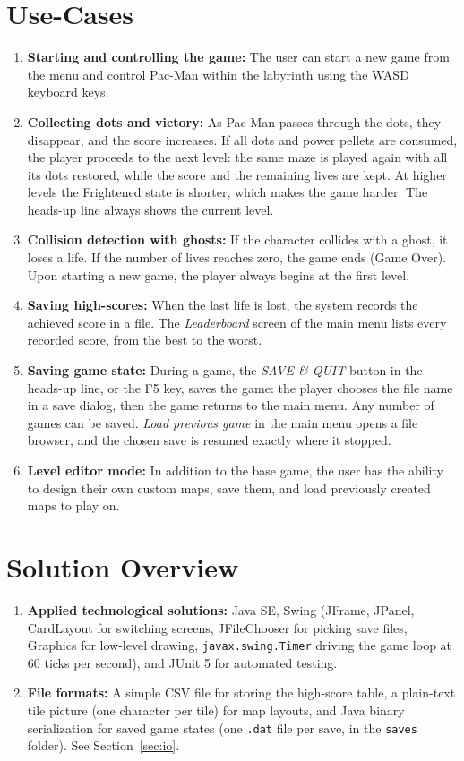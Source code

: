 \documentclass[11pt, a4paper]{article}
\begin{document}
\section{Use-Cases}
\begin{enumerate}
    \item \textbf{Starting and controlling the game:} The user can start a new game from the menu and control Pac-Man within the labyrinth using the WASD keyboard keys.
    \item \textbf{Collecting dots and victory:} As Pac-Man passes through the dots, they disappear, and the score increases. If all dots and power pellets are consumed, the player proceeds to the next level: the same maze is played again with all its dots restored, while the score and the remaining lives are kept. At higher levels the Frightened state is shorter, which makes the game harder. The heads-up line always shows the current level.
    \item \textbf{Collision detection with ghosts:} If the character collides with a ghost, it loses a life. If the number of lives reaches zero, the game ends (Game Over). Upon starting a new game, the player always begins at the first level.
    \item \textbf{Saving high-scores:} When the last life is lost, the system records the achieved score in a file. The \textit{Leaderboard} screen of the main menu lists every recorded score, from the best to the worst.
    \item \textbf{Saving game state:} During a game, the \textit{SAVE \& QUIT} button in the heads-up line, or the F5 key, saves the game: the player chooses the file name in a save dialog, then the game returns to the main menu. Any number of games can be saved. \textit{Load previous game} in the main menu opens a file browser, and the chosen save is resumed exactly where it stopped.
    \item \textbf{Level editor mode:} In addition to the base game, the user has the ability to design their own custom maps, save them, and load previously created maps to play on.
\end{enumerate}

\section{Solution Overview}
\begin{enumerate}
    \item \textbf{Applied technological solutions:} Java SE, Swing (JFrame, JPanel, CardLayout for switching screens, JFileChooser for picking save files, Graphics for low-level drawing, \texttt{javax.swing.Timer} driving the game loop at 60 ticks per second), and JUnit 5 for automated testing.
    \item \textbf{File formats:} A simple CSV file for storing the high-score table, a plain-text tile picture (one character per tile) for map layouts, and Java binary serialization for saved game states (one \texttt{.dat} file per save, in the \texttt{saves} folder). See Section~\ref{sec:io}.
\end{enumerate}
\end{document}

